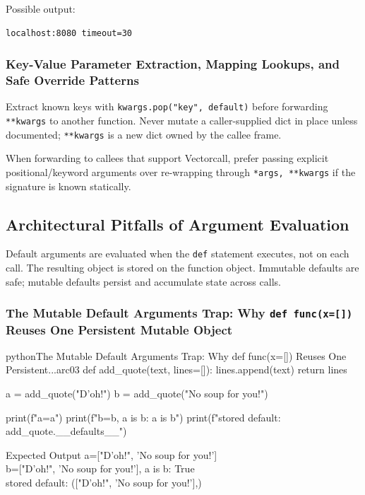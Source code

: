 \documentclass[a4paper,twoside]{report}
\begin{document}
Possible output:

\begin{verbatim}
localhost:8080 timeout=30
\end{verbatim}

\subsubsection{Key-Value Parameter Extraction, Mapping Lookups, and Safe Override Patterns}

Extract known keys with \texttt{kwargs.pop("key", default)} before forwarding \texttt{**kwargs} to another function. Never mutate a caller-supplied dict in place unless documented; \texttt{**kwargs} is a new dict owned by the callee frame.

When forwarding to callees that support Vectorcall, prefer passing explicit positional/keyword arguments over re-wrapping through \texttt{*args, **kwargs} if the signature is known statically.


\subsection{Architectural Pitfalls of Argument Evaluation}

Default arguments are evaluated when the \texttt{def} statement executes, not on each call. The resulting object is stored on the function object. Immutable defaults are safe; mutable defaults persist and accumulate state across calls.

\subsubsection{The Mutable Default Arguments Trap: Why \texttt{def func(x=[])} Reuses One Persistent Mutable Object}

\begin{codebox}[]{python}{The Mutable Default Arguments Trap: Why def func(x=[]) Reuses One Persistent...}{arc03}
def add_quote(text, lines=[]):
    lines.append(text)
    return lines

a = add_quote("D'oh!")
b = add_quote("No soup for you!")

print(f"a={a}")
print(f"b={b}, a is b: {a is b}")
print(f"stored default: {add_quote.__defaults__}")
\end{codebox}


\begin{iobox}{Expected Output}
a=["D'oh!", 'No soup for you!'] \\
b=["D'oh!", 'No soup for you!'], a is b: True \\
stored default: (["D'oh!", 'No soup for you!'],) \\
\end{iobox}
\end{document}
